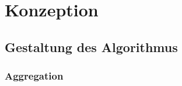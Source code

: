 
\chapter{Konzeption}
\label{ch:algorithmus}

\section{Gestaltung des Algorithmus}

\subsection{Aggregation}

